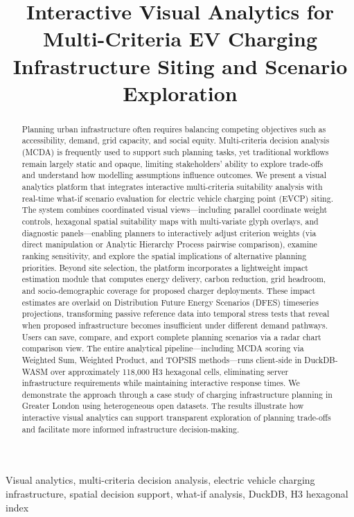 \documentclass[journal]{IEEEtran}
\title{Interactive Visual Analytics for Multi-Criteria EV Charging Infrastructure Siting and Scenario Exploration}
\author{
  \IEEEauthorblockN{Author Names}
  \IEEEauthorblockA{Affiliation \\
  Email}
}
\begin{document}
\maketitle

\begin{abstract}
Planning urban infrastructure often requires balancing competing objectives such as accessibility, demand, grid capacity, and social equity. Multi-criteria decision analysis (MCDA) is frequently used to support such planning tasks, yet traditional workflows remain largely static and opaque, limiting stakeholders' ability to explore trade-offs and understand how modelling assumptions influence outcomes. We present a visual analytics platform that integrates interactive multi-criteria suitability analysis with real-time what-if scenario evaluation for electric vehicle charging point (EVCP) siting. The system combines coordinated visual views---including parallel coordinate weight controls, hexagonal spatial suitability maps with multi-variate glyph overlays, and diagnostic panels---enabling planners to interactively adjust criterion weights (via direct manipulation or Analytic Hierarchy Process pairwise comparison), examine ranking sensitivity, and explore the spatial implications of alternative planning priorities. Beyond site selection, the platform incorporates a lightweight impact estimation module that computes energy delivery, carbon reduction, grid headroom, and socio-demographic coverage for proposed charger deployments. These impact estimates are overlaid on Distribution Future Energy Scenarios (DFES) timeseries projections, transforming passive reference data into temporal stress tests that reveal when proposed infrastructure becomes insufficient under different demand pathways. Users can save, compare, and export complete planning scenarios via a radar chart comparison view. The entire analytical pipeline---including MCDA scoring via Weighted Sum, Weighted Product, and TOPSIS methods---runs client-side in DuckDB-WASM over approximately 118,000 H3 hexagonal cells, eliminating server infrastructure requirements while maintaining interactive response times. We demonstrate the approach through a case study of charging infrastructure planning in Greater London using heterogeneous open datasets. The results illustrate how interactive visual analytics can support transparent exploration of planning trade-offs and facilitate more informed infrastructure decision-making.
\end{abstract}

\begin{IEEEkeywords}
Visual analytics, multi-criteria decision analysis, electric vehicle charging infrastructure, spatial decision support, what-if analysis, DuckDB, H3 hexagonal index
\end{IEEEkeywords}











\end{document}
